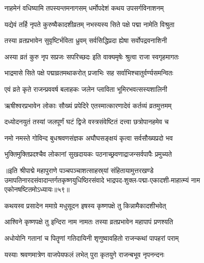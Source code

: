 
\twolineshloka
{नाहमेनं वधिष्यामि तपस्यन्तमनागसम्}
{धर्मोपदेशं कथय उपसर्गविनाशनम्}%


\twolineshloka
{यद्येवं तर्हि नृपते कुरुष्वैकादशीव्रतम्}
{नभस्यस्य सिते पक्षे पद्मा नामेति विश्रुता}%

\twolineshloka
{तस्या व्रतप्रभावेन सुवृष्टिर्भविता ध्रुवम्}
{सर्वसिद्धिप्रदा ह्येषा सर्वोपद्रवनाशिनी}%

\twolineshloka
{अस्या व्रतं कुरु नृप सप्रजः सपरिच्छदः}
{इति वाक्यमृषेः श्रुत्वा राजा स्वगृहमागतः}%

\twolineshloka
{भाद्रमासे सिते पक्षे पद्माव्रतमथाकरोत्}
{प्रजाभिः सह सर्वाभिश्चातुर्वर्ण्यसमन्वितः}%

\twolineshloka
{एवं व्रते कृते राजन्प्रववर्ष बलाहकः}
{जलेन प्लाविता भूमिरभवत्सस्यशालिनी}%

\twolineshloka
{ऋषीश्वरप्रभावेन लोकाः सौख्यं प्रपेदिरे}
{एतस्मात्कारणादेवं कर्तव्यं व्रतमुत्तमम्}%

\twolineshloka
{दध्योदनयुतं तस्यां जलपूर्णं घटं द्विजे}
{वस्त्रसंवेष्टितं दत्त्वा छत्रोपानहमेव च}%

\twolineshloka
{नमो नमस्ते गोविन्द बुधश्रवणसंज्ञक}
{अघौघसङ्क्षयं कृत्वा सर्वसौख्यप्रदो भव}%

\twolineshloka
{भुक्तिमुक्तिप्रदश्चैव लोकानां सुखदायकः}
{पठनाच्छ्रवणाद्राजन्सर्वपापैः प्रमुच्यते}%

॥इति श्रीपाद्मे महापुराणे पञ्चपञ्चाशत्साहस्र्यां संहितायामुत्तरखण्डे उमापतिनारदसंवादान्तर्गतकृष्णयुधिष्ठिरसंवादे भाद्रपद-शुक्ल-पद्मा-एकादशी-माहात्म्यं नाम एकोनषष्टितमोऽध्यायः॥५९॥


\hyperref[sec:ekadashi_mahatmyam_padma_puranam]{\closesub}
\clearpage

\label{sec:padma-ashvina-krishnendira}



\twolineshloka
{कथयस्व प्रसादेन ममाग्रे मधुसूदन}
{इषस्य कृष्णपक्षे तु किन्नामैकादशीभवेत्}%


\twolineshloka
{आश्विने कृष्णपक्षे तु इन्दिरा नाम नामतः}
{तस्या व्रतप्रभावेन महापापं प्रणश्यति}%

\twolineshloka
{अधोयोनि गतानां च पितॄणां गतिदायिनी}
{शृणुष्वावहितो राजन्कथां पापहरां पराम्}%

\twolineshloka
{यस्याः श्रवणमात्रेण वाजपेयफलं लभेत्}
{पुरा कृतयुगे राजन्बभूव नृपनन्दनः}%

